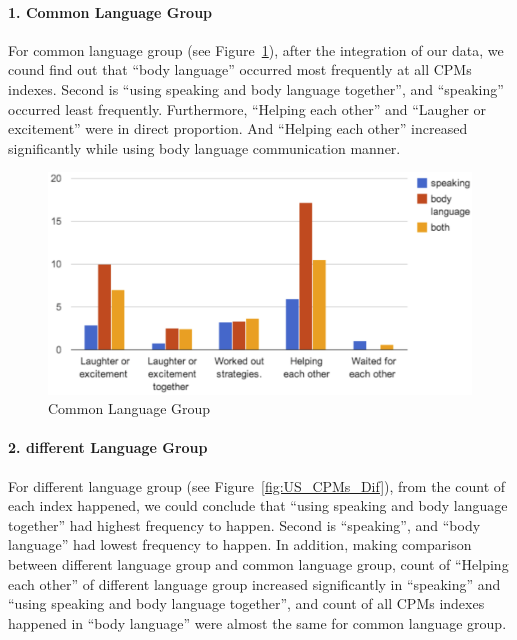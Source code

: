 \paragraph{1. Common Language Group}
For common language group (see Figure~\ref{fig:US_CPMs_Com}), after the integration of our data, we cound find out that ``body language'' occurred most frequently at all CPMs indexes. Second is ``using speaking and body language together'', and ``speaking'' occurred least frequently. Furthermore, ``Helping each other'' and ``Laugher or excitement'' were in direct proportion. And ``Helping each other'' increased significantly while using body language communication manner.

\begin{figure}[!h]
\centering
\includegraphics[width=0.9\columnwidth]{Figures/US_CPMs_Com.png}
\caption{Common Language Group}
\label{fig:US_CPMs_Com}
\end{figure}


\paragraph{2. different Language Group}
For different language group (see Figure~\ref{fig:US_CPMs_Dif}), from the count of each index happened, we could conclude that ``using speaking and body language together'' had highest frequency to happen. Second is ``speaking'', and ``body language'' had lowest frequency to happen. In addition, 
making comparison between different language group and common language group, count of ``Helping each other'' of different language group increased significantly in ``speaking'' and ``using speaking and body language together'', and count of all CPMs indexes happened in ``body language'' were almost the same for common language group.



